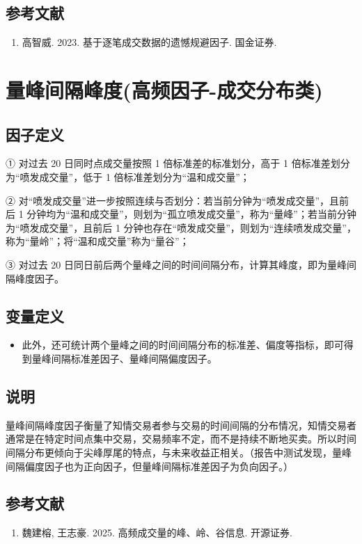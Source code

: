 \documentclass{article}
\begin{document}
\subsection{参考文献}
\begin{enumerate}
    \item 高智威. 2023. 基于逐笔成交数据的遗憾规避因子. 国金证券.
\end{enumerate}

\section{量峰间隔峰度(高频因子-成交分布类)}

\subsection{因子定义}

① 对过去 20 日同时点成交量按照 1 倍标准差的标准划分，高于 1 倍标准差划分为“喷发成交量”，低于 1 倍标准差划分为“温和成交量”；

② 对“喷发成交量”进一步按照连续与否划分：若当前分钟为“喷发成交量”，且前后 1 分钟均为“温和成交量”，则划为“孤立喷发成交量”，称为“量峰”；若当前分钟为“喷发成交量”，且前后 1 分钟也存在“喷发成交量”，则划为“连续喷发成交量”，称为“量岭”；将“温和成交量”称为“量谷”；

③ 对过去 20 日同日前后两个量峰之间的时间间隔分布，计算其峰度，即为量峰间隔峰度因子。

\subsection{变量定义}
\begin{itemize}
    \item 此外，还可统计两个量峰之间的时间间隔分布的标准差、偏度等指标，即可得到量峰间隔标准差因子、量峰间隔偏度因子。
\end{itemize}

\subsection{说明}
量峰间隔峰度因子衡量了知情交易者参与交易的时间间隔的分布情况，知情交易者通常是在特定时间点集中交易，交易频率不定，而不是持续不断地买卖。所以时间间隔分布更倾向于尖峰厚尾的特点，与未来收益正相关。（报告中测试发现，量峰间隔偏度因子也为正向因子，但量峰间隔标准差因子为负向因子。）

\subsection{参考文献}
\begin{enumerate}
    \item 魏建榕, 王志豪. 2025. 高频成交量的峰、岭、谷信息. 开源证券.
\end{enumerate}
\end{document}
